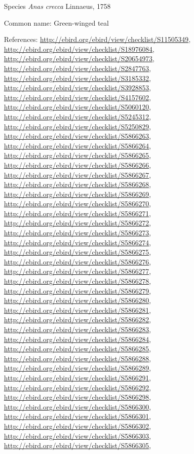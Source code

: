 \documentclass[9pt, article]{memoir}
\begin{document}
\begin{multicols}{2}
\vspace{6pt}\noindent\hspace{36pt}Species \textit{Anas crecca} Linnaeus, 1758


Common name: Green-winged teal

References: 
\url{http://ebird.org/ebird/view/checklist/S11505349}, 
\url{http://ebird.org/ebird/view/checklist/S18976084}, 
\url{http://ebird.org/ebird/view/checklist/S20654973}, 
\url{http://ebird.org/ebird/view/checklist/S2847763}, 
\url{http://ebird.org/ebird/view/checklist/S3185332}, 
\url{http://ebird.org/ebird/view/checklist/S3928853}, 
\url{http://ebird.org/ebird/view/checklist/S4157602}, 
\url{http://ebird.org/ebird/view/checklist/S5060120}, 
\url{http://ebird.org/ebird/view/checklist/S5245312}, 
\url{http://ebird.org/ebird/view/checklist/S5250829}, 
\url{http://ebird.org/ebird/view/checklist/S5866263}, 
\url{http://ebird.org/ebird/view/checklist/S5866264}, 
\url{http://ebird.org/ebird/view/checklist/S5866265}, 
\url{http://ebird.org/ebird/view/checklist/S5866266}, 
\url{http://ebird.org/ebird/view/checklist/S5866267}, 
\url{http://ebird.org/ebird/view/checklist/S5866268}, 
\url{http://ebird.org/ebird/view/checklist/S5866269}, 
\url{http://ebird.org/ebird/view/checklist/S5866270}, 
\url{http://ebird.org/ebird/view/checklist/S5866271}, 
\url{http://ebird.org/ebird/view/checklist/S5866272}, 
\url{http://ebird.org/ebird/view/checklist/S5866273}, 
\url{http://ebird.org/ebird/view/checklist/S5866274}, 
\url{http://ebird.org/ebird/view/checklist/S5866275}, 
\url{http://ebird.org/ebird/view/checklist/S5866276}, 
\url{http://ebird.org/ebird/view/checklist/S5866277}, 
\url{http://ebird.org/ebird/view/checklist/S5866278}, 
\url{http://ebird.org/ebird/view/checklist/S5866279}, 
\url{http://ebird.org/ebird/view/checklist/S5866280}, 
\url{http://ebird.org/ebird/view/checklist/S5866281}, 
\url{http://ebird.org/ebird/view/checklist/S5866282}, 
\url{http://ebird.org/ebird/view/checklist/S5866283}, 
\url{http://ebird.org/ebird/view/checklist/S5866284}, 
\url{http://ebird.org/ebird/view/checklist/S5866285}, 
\url{http://ebird.org/ebird/view/checklist/S5866288}, 
\url{http://ebird.org/ebird/view/checklist/S5866289}, 
\url{http://ebird.org/ebird/view/checklist/S5866291}, 
\url{http://ebird.org/ebird/view/checklist/S5866292}, 
\url{http://ebird.org/ebird/view/checklist/S5866298}, 
\url{http://ebird.org/ebird/view/checklist/S5866300}, 
\url{http://ebird.org/ebird/view/checklist/S5866301}, 
\url{http://ebird.org/ebird/view/checklist/S5866302}, 
\url{http://ebird.org/ebird/view/checklist/S5866303}, 
\url{http://ebird.org/ebird/view/checklist/S5866305}, 

\end{multicols}
\end{document}

